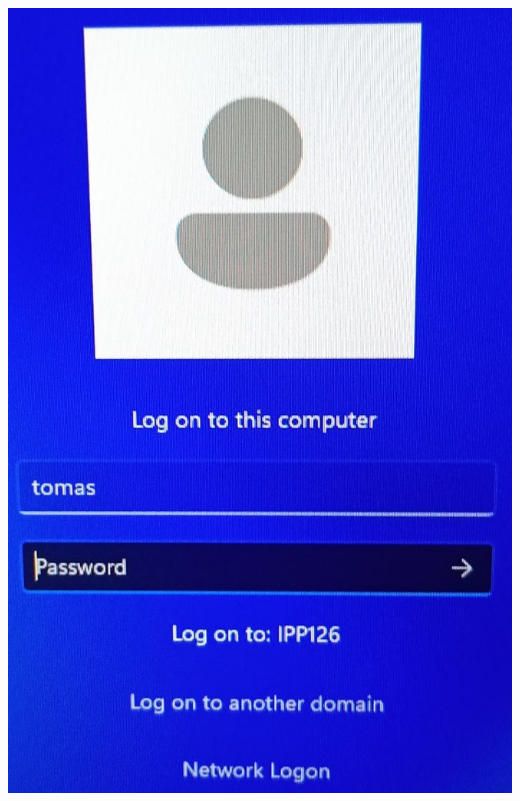 \documentclass[fleqn,a4paper,20pt]{article}
\begin{document}
\begin{minipage}{.02\textwidth}
$\ $\\
\end{minipage}
\begin{minipage}{.3\textwidth}
\centering
\includegraphics[width=\linewidth]{PC2}
\label{PC1}
\end{minipage}
\end{document}
